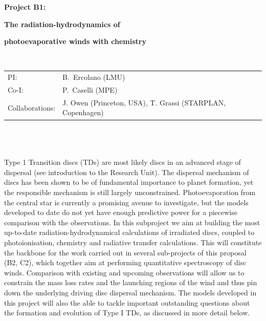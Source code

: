 \documentclass[10pt,fleqn,twoside]{article}
\newcommand{\Tcol}{\color{blue}}
\begin{document}
\newpage


\setcounter{page}{1}

\centerline{\huge\bf\Tcol
%
%
%
%
%
 Project B1:}

\centerline{\huge\bf\Tcol The radiation-hydrodynamics of}

\centerline{\huge\bf\Tcol photoevaporative winds with chemistry}

%
%
%
%
%
\vskip1.0cm

\\
\begin{tabular}{ll}
{\textsf{PI:}}                  & B.~Ercolano (LMU)\\
{\textsf{Co-I:}}                &P.~Caselli (MPE)\\
{\textsf{Collaborations:}}      & J. Owen (Princeton, USA), T. Grassi (STARPLAN, Copenhagen)  \
\end{tabular}


\vspace{1em}
 \\

\vspace{1em}
\\

\\
Type 1 Transition discs (TDs) are most likely discs in an advanced stage of dispersal
(see introduction to the Research Unit). The
dispersal mechanism of discs has been shown to be of fundamental importance to planet
formation, yet the responsible mechanism is still largely
unconstrained. Photoevaporation from the central star is currently a
promising avenue to investigate, but the models developed to date do
not yet have enough predictive power for a piecewise comparison with
the observations. In this subproject we aim at building the most
up-to-date radiation-hydrodynamical calculations of irradiated discs, 
coupled to photoionisation, chemistry and radiative transfer
calculations. This will constitute the backbone for the work carried
out in several sub-projects of this proposal (B2, C2), which together
aim at performing quantitative
spectroscopy of disc winds. Comparison with existing and upcoming
observations will allow us to constrain the mass loss rates and the
launching regions of the wind and thus pin down the underlying driving disc
dispersal mechanism. 
The models developed in this project will also the able to tackle
important outstanding questions about the formation and evolution of
Type I TDs, as discussed in more detail below. 
\end{document}
